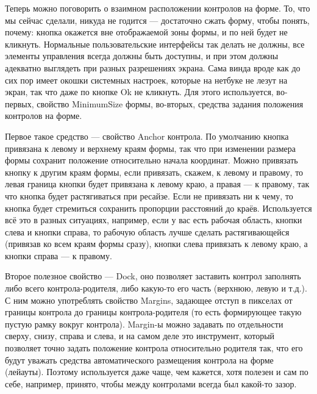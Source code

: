 \documentclass{../../text-style}
\begin{document}
Теперь можно поговорить о взаимном расположении контролов на форме. То, что мы сейчас сделали, никуда не годится --- достаточно сжать форму, чтобы понять, почему: кнопка окажется вне отображаемой зоны формы, и по ней будет не кликнуть. Нормальные пользовательские интерфейсы так делать не должны, все элементы управления всегда должны быть доступны, и при этом должны адекватно выглядеть при разных разрешениях экрана. Сама винда вроде как до сих пор имеет окошки системных настроек, которые на нетбуке не лезут на экран, так что даже по кнопке Ok не кликнуть. Для этого используется, во-первых, свойство MinimumSize формы, во-вторых, средства задания положения контролов на форме. 

Первое такое средство --- свойство Anchor контрола. По умолчанию кнопка привязана к левому и верхнему краям формы, так что при изменении размера формы сохранит положение относительно начала координат. Можно привязать кнопку к другим краям формы, если привязать, скажем, к левому и правому, то левая граница кнопки будет привязана к левому краю, а правая --- к правому, так что кнопка будет растягиваться при ресайзе. Если не привязать ни к чему, то кнопка будет стремиться сохранить пропорции расстояний до краёв. Используется всё это в разных ситуациях, например, если у вас есть рабочая область, кнопки слева и кнопки справа, то рабочую область лучше сделать растягивающейся (привязав ко всем краям формы сразу), кнопки слева привязать к левому краю, а кнопки справа --- к правому.

Второе полезное свойство --- Dock, оно позволяет заставить контрол заполнять либо всего контрола-родителя, либо какую-то его часть (верхнюю, левую и т.д.). С ним можно употреблять свойство Margins, задающее отступ в пикселах от границы контрола до границы контрола-родителя (то есть формирующее такую пустую рамку вокруг контрола). Margin-ы можно задавать по отдельности сверху, снизу, справа и слева, и на самом деле это инструмент, который позволяет точно задать положение контрола относительно родителя так, что его будут уважать средства автоматического размещения контрола на форме (лейауты). Поэтому используется даже чаще, чем кажется, хотя полезен и сам по себе, например, принято, чтобы между контролами всегда был какой-то зазор.
\end{document}
